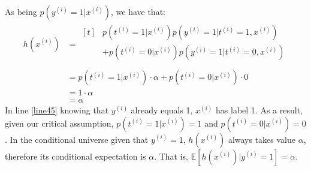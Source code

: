\begin{answer}
	As being $p(y^{(i)} = 1|x^{(i)})$, we have that:
\begin{align}
	h(x^{(i)}) &=
	\begin{aligned}[t]  
	& p(t^{(i)} = 1|x^{(i)}) p(y^{(i)} = 1|t^{(i)} = 1, x^{(i)}) \\
	& + p(t^{(i)} = 0|x^{(i)}) p(y^{(i)} = 1|t^{(i)} = 0, x^{(i)}) \\
	\end{aligned} \\
	&= p(t^{(i)} = 1|x^{(i)}) \cdot \alpha + p(t^{(i)} = 0|x^{(i)}) \cdot 0 \\
	&= 1 \cdot \alpha \label{line45} \\
	&= \alpha
\end{align}
%
In line \eqref{line45} knowing that $y^{(i)}$ already equals 1, $x^{(i)}$ has label 1. As a result, given our critical assumption, $p(t^{(i)} = 1|x^{(i)}) = 1$ and $p(t^{(i)} = 0|x^{(i)}) = 0$. In the conditional universe given that $y^{(i)} = 1$, $h(x^{(i)})$ always takes value $\alpha$, therefore its conditional expectation is $\alpha$. That is, $\mathbb{E}[h(x^{(i)}) | y^{(i)} = 1] = \alpha$. \\
\end{answer}